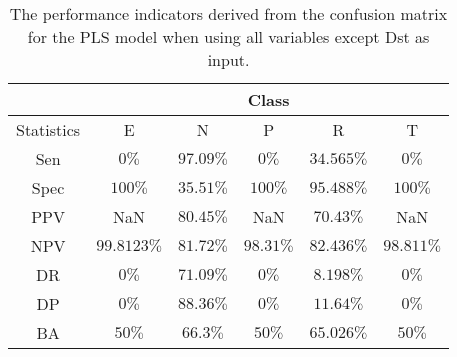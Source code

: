 \begin{table}[!ht]
	\centering
	\begin{tabular}{|c|c|c|c|c|c|}
		\hline
		 & \multicolumn{5}{c|}{Class} \\ \hline
		Statistics & E & N & P & R & T \\ \hline
		Sen & $0\%$ & $97.09\%$ & $0\%$ & $34.565\%$ & $0\%$ \\ \hline
		Spec & $100\%$ & $35.51\%$ & $100\%$ & $95.488\%$ & $100\%$ \\ \hline
		PPV & NaN & $80.45\%$ & NaN & $70.43\%$ & NaN \\ \hline
		NPV & $99.8123\%$ & $81.72\%$ & $98.31\%$ & $82.436\%$ & $98.811\%$ \\ \hline
		DR & $0\%$ & $71.09\%$ & $0\%$ & $8.198\%$ & $0\%$ \\ \hline
		DP & $0\%$ & $88.36\%$ & $0\%$ & $11.64\%$ & $0\%$ \\ \hline
		BA & $50\%$ & $66.3\%$ & $50\%$ & $65.026\%$ & $50\%$ \\ \hline
	\end{tabular}
	\caption{The performance indicators derived from the confusion matrix for the PLS model when using all variables except Dst as input.}
	\label{tab:cs:reverse:noDst:pls}
\end{table}

